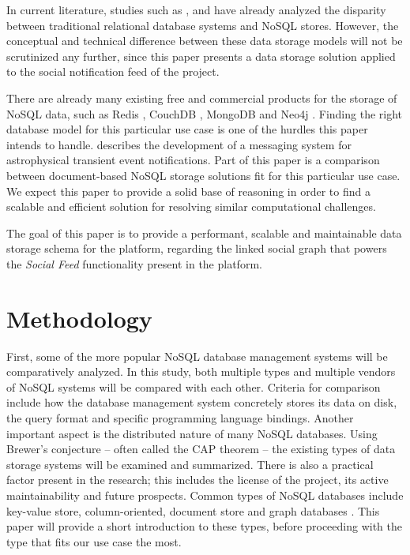 \documentclass[fleqn,10pt]{voorstel}
\begin{document}
In current literature, studies such as \textcite{Moniruzzaman2013}, \textcite{NayakPoriyaPoojary2003} and \textcite{HammesMederoMitchell2014} have already analyzed the disparity between traditional relational database systems and NoSQL stores.
However, the conceptual and technical difference between these data storage models will not be scrutinized any further, since this paper presents a data storage solution applied to the social notification feed of the \textcite{OpenWebslides} project.

There are already many existing free and commercial products for the storage of NoSQL data, such as Redis \autocite{Redis}, CouchDB \autocite{CouchDB}, MongoDB \autocite{MongoDB} and Neo4j \autocite{Neo4j}. Finding the right database model for this particular use case is one of the hurdles this paper intends to handle. \textcite{Zhao2015} describes the development of a messaging system for astrophysical transient event notifications. Part of this paper is a comparison between document-based NoSQL storage solutions fit for this particular use case. We expect this paper to provide a solid base of reasoning in order to find a scalable and efficient solution for resolving similar computational challenges.

The goal of this paper is to provide a performant, scalable and maintainable data storage schema for the \textcite{OpenWebslides} platform, regarding the linked social graph that powers the \textit{Social Feed} functionality present in the platform.


\section{Methodology}
\label{sec:methodology}

First, some of the more popular NoSQL database management systems will be comparatively analyzed. In this study, both multiple types and multiple vendors of NoSQL systems will be compared with each other. Criteria for comparison include how the database management system concretely stores its data on disk, the query format and specific programming language bindings. Another important aspect is the distributed nature of many NoSQL databases. Using Brewer's conjecture \autocite{Brewer2002} -- often called the CAP theorem -- the existing types of data storage systems will be examined and summarized. There is also a practical factor present in the research; this includes the license of the project, its active maintainability and future prospects.
Common types of NoSQL databases include key-value store, column-oriented, document store and graph databases \autocite{NayakPoriyaPoojary2003}. This paper will provide a short introduction to these types, before proceeding with the type that fits our use case the most.
\end{document}
